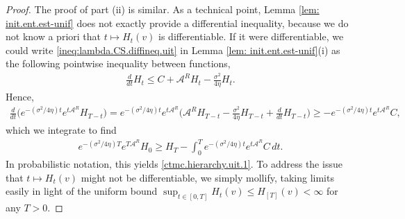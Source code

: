 \documentclass[11pt,reqno]{amsart}
\numberwithin{equation}{section}
\theoremstyle{definition}
\def\CC{{C}}
\def\A{{\mathcal A}}
\begin{document}
\begin{proof}
The proof of part (ii) is similar. As a technical point, Lemma \ref{lem: init.ent.est-unif} does not exactly provide a differential inequality, because we do not know a priori that $t \mapsto H_t(v)$ is differentiable.
If it were differentiable, we could write \eqref{ineq:lambda.CS.diffineq.uit} in Lemma \ref{lem: init.ent.est-unif}(i) as the following pointwise inequality between functions,
\begin{align*}
\frac{d}{dt} H_{t}   \leq \CC + \A^{R} H_{t} - \frac{\sigma^2}{4\eta} H_t.
\end{align*}
Hence,
\begin{align*}
\frac{d}{dt}\Big(e^{-(\sigma^2/4\eta)t} e^{t\A^{R}} H_{ T-t }\Big) = e^{-(\sigma^2/4\eta)t}e^{t\A^{R}} \Big(\A^{R} H_{ T-t } -  \frac{\sigma^2}{4\eta} H_{T-t} + \frac{d}{dt}H_{ T-t }\Big)  \ge - e^{-(\sigma^2/4\eta)t} e^{t\A^{R}}\CC,
\end{align*}
which we integrate to find
\begin{align*}
e^{-(\sigma^2/4\eta)T} e^{T\A^{R}}H_0 \ge H_T - \int_0^T e^{-(\sigma^2/4\eta)t}e^{t\A^{R}}\CC\,dt.
\end{align*}
In probabilistic notation, this yields \eqref{ctmc.hierarchy.uit.1}. To address the issue that $t \mapsto H_t(v)$ might not be differentiable, we simply mollify, taking limits easily in light of the uniform bound $\sup_{t \in [0,T]}H_t(v) \le H_{[T]}(v) < \infty$ for any $T > 0$. 
\end{proof}
\end{document}
